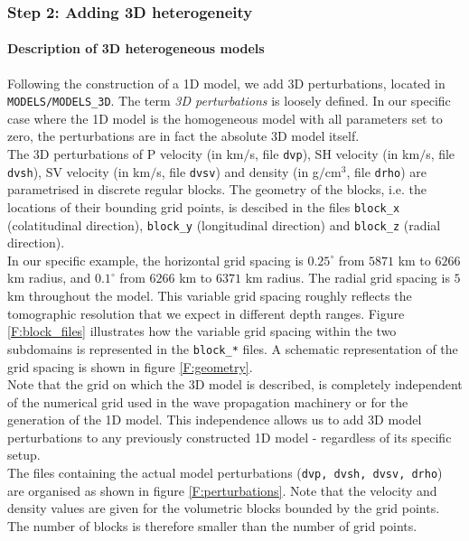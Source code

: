 \subsubsection{Step 2: Adding 3D heterogeneity}

\paragraph{Description of 3D heterogeneous models}\label{S:3Dmodels}

Following the construction of a 1D model, we add 3D perturbations, located in \texttt{MODELS/MODELS\_3D}. The term \emph{3D perturbations} is loosely defined. In our specific case where the 1D model is the homogeneous model with all parameters set to zero, the perturbations are in fact the absolute 3D model itself.\\[5pt]
The 3D perturbations of P velocity (in km$/$s, file \texttt{dvp}), SH velocity (in km$/$s, file \texttt{dvsh}), SV velocity (in km$/$s, file \texttt{dvsv}) and density (in g$/$cm$^3$, file \texttt{drho}) are parametrised in discrete regular blocks. The geometry of the blocks, i.e. the locations of their bounding grid points, is descibed in the files \texttt{block\_x} (colatitudinal direction), \texttt{block\_y} (longitudinal direction) and \texttt{block\_z} (radial direction).\\[5pt]
In our specific example, the horizontal grid spacing is $0.25^\circ$ from $5871$ km to $6266$ km radius, and $0.1^\circ$ from $6266$ km to $6371$ km radius. The radial grid spacing is $5$ km throughout the model. This variable grid spacing roughly reflects the tomographic resolution that we expect in different depth ranges. Figure \ref{F:block_files} illustrates how the variable grid spacing within the two subdomains is represented in the \texttt{block\_*} files. A schematic representation of the grid spacing is shown in figure \ref{F:geometry}.\\[5pt]
Note that the grid on which the 3D model is described, is completely independent of the numerical grid used in the wave propagation machinery or for the generation of the 1D model. This independence allows us to add 3D model perturbations to any previously constructed 1D model - regardless of its specific setup.\\[5pt]
The files containing the actual model perturbations (\texttt{dvp, dvsh, dvsv, drho}) are organised as shown in figure \ref{F:perturbations}. Note that the velocity and density values are given for the volumetric blocks bounded by the grid points. The number of blocks is therefore smaller than the number of grid points.
